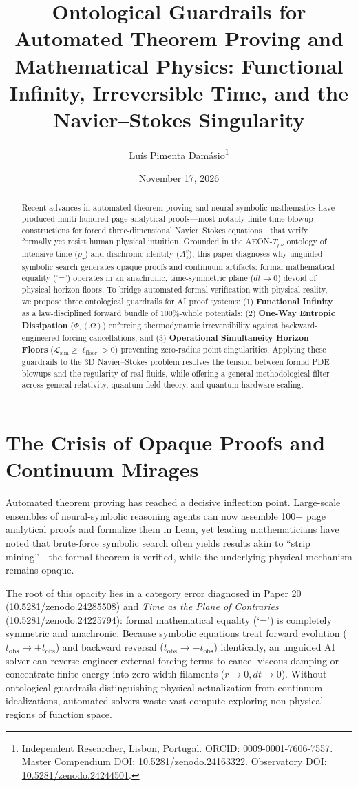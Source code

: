 \documentclass[11pt,a4paper]{article}
\title{Ontological Guardrails for Automated Theorem Proving and Mathematical Physics: Functional Infinity, Irreversible Time, and the Navier--Stokes Singularity}
\author{Lu\'is Pimenta Dam\'asio\thanks{Independent Researcher, Lisbon, Portugal. ORCID: \href{https://orcid.org}{0009-0001-7606-7557}. Master Compendium DOI: \href{https://doi.org}{10.5281/zenodo.24163322}. Observatory DOI: \href{https://doi.org}{10.5281/zenodo.24244501}.}}
\date{November 17, 2026}
\begin{document}
\maketitle

\begin{abstract}
Recent advances in automated theorem proving and neural-symbolic mathematics have produced multi-hundred-page analytical proofs---most notably finite-time blowup constructions for forced three-dimensional Navier--Stokes equations---that verify formally yet resist human physical intuition. Grounded in the \textsc{AEON}-$T_{\mu\nu}$ ontology of intensive time ($\rho_\tau$) and diachronic identity ($A_s^v$), this paper diagnoses why unguided symbolic search generates opaque proofs and continuum artifacts: formal mathematical equality (`=') operates in an anachronic, time-symmetric plane ($dt \to 0$) devoid of physical horizon floors. To bridge automated formal verification with physical reality, we propose three ontological guardrails for AI proof systems: (1) \textbf{Functional Infinity} as a law-disciplined forward bundle of $100\%$-whole potentials; (2) \textbf{One-Way Entropic Dissipation} ($\Phi_\tau(\Omega)$) enforcing thermodynamic irreversibility against backward-engineered forcing cancellations; and (3) \textbf{Operational Simultaneity Horizon Floors} ($\mathcal{L}_{\text{sim}} \ge \ell_{\text{floor}} > 0$) preventing zero-radius point singularities. Applying these guardrails to the 3D Navier--Stokes problem resolves the tension between formal PDE blowups and the regularity of real fluids, while offering a general methodological filter across general relativity, quantum field theory, and quantum hardware scaling.
\end{abstract}

\section{The Crisis of Opaque Proofs and Continuum Mirages}
Automated theorem proving has reached a decisive inflection point. Large-scale ensembles of neural-symbolic reasoning agents can now assemble 100+ page analytical proofs and formalize them in Lean, yet leading mathematicians have noted that brute-force symbolic search often yields results akin to ``strip mining''---the formal theorem is verified, while the underlying physical mechanism remains opaque.

The root of this opacity lies in a category error diagnosed in Paper 20 (\href{https://doi.org}{10.5281/zenodo.24285508}) and \emph{Time as the Plane of Contraries} (\href{https://doi.org}{10.5281/zenodo.24225794}): formal mathematical equality (`=') is completely symmetric and anachronic. Because symbolic equations treat forward evolution ($t_{\text{obs}} \to +t_{\text{obs}}$) and backward reversal ($t_{\text{obs}} \to -t_{\text{obs}}$) identically, an unguided AI solver can reverse-engineer external forcing terms to cancel viscous damping or concentrate finite energy into zero-width filaments ($r \to 0, dt \to 0$). Without ontological guardrails distinguishing physical actualization from continuum idealizations, automated solvers waste vast compute exploring non-physical regions of function space.
\end{document}
